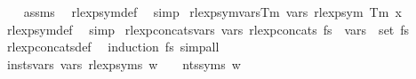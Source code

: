 \begin{isabellebody}
%
\isadelimproof
\ \ %
\endisadelimproof
%
\isatagproof
{}\isamarkupfalse%
\ assms\ \isamarkupfalse%
\ rlexp{\isacharunderscore}{\kern0pt}sym{\isacharunderscore}{\kern0pt}def\ \isamarkupfalse%
\ simp%
\endisatagproof
{\isafoldproof}%
%
\isadelimproof
\isanewline
%
\endisadelimproof
\isanewline
{}\isamarkupfalse%
\ rlexp{\isacharunderscore}{\kern0pt}sym{\isacharunderscore}{\kern0pt}vars{\isacharunderscore}{\kern0pt}Tm{\isacharcolon}{\kern0pt}\ {\isachardoublequoteopen}vars\ {\isacharparenleft}{\kern0pt}rlexp{\isacharunderscore}{\kern0pt}sym\ {\isacharparenleft}{\kern0pt}Tm\ x{\isacharparenright}{\kern0pt}{\isacharparenright}{\kern0pt}\ {\isacharequal}{\kern0pt}\ {\isacharbraceleft}{\kern0pt}{\isacharbraceright}{\kern0pt}{\isachardoublequoteclose}\isanewline
%
\isadelimproof
\ \ %
\endisadelimproof
%
\isatagproof
{}\isamarkupfalse%
\ rlexp{\isacharunderscore}{\kern0pt}sym{\isacharunderscore}{\kern0pt}def\ \isamarkupfalse%
\ simp%
\endisatagproof
{\isafoldproof}%
%
\isadelimproof
\isanewline
%
\endisadelimproof
\isanewline
{}\isamarkupfalse%
\ rlexp{\isacharunderscore}{\kern0pt}concats{\isacharunderscore}{\kern0pt}vars{\isacharcolon}{\kern0pt}\ {\isachardoublequoteopen}vars\ {\isacharparenleft}{\kern0pt}rlexp{\isacharunderscore}{\kern0pt}concats\ fs{\isacharparenright}{\kern0pt}\ {\isacharequal}{\kern0pt}\ {\isasymUnion}{\isacharparenleft}{\kern0pt}vars\ {\isacharbackquote}{\kern0pt}\ set\ fs{\isacharparenright}{\kern0pt}{\isachardoublequoteclose}\isanewline
%
\isadelimproof
\ \ %
\endisadelimproof
%
\isatagproof
{}\isamarkupfalse%
\ rlexp{\isacharunderscore}{\kern0pt}concats{\isacharunderscore}{\kern0pt}def\ \isamarkupfalse%
\ {\isacharparenleft}{\kern0pt}induction\ fs{\isacharparenright}{\kern0pt}\ simp{\isacharunderscore}{\kern0pt}all%
\endisatagproof
{\isafoldproof}%
%
\isadelimproof
\isanewline
%
\endisadelimproof
\isanewline
\isanewline
{}\isamarkupfalse%
\ insts{\isacharprime}{\kern0pt}{\isacharunderscore}{\kern0pt}vars{\isacharcolon}{\kern0pt}\ {\isachardoublequoteopen}vars\ {\isacharparenleft}{\kern0pt}rlexp{\isacharunderscore}{\kern0pt}syms\ w{\isacharparenright}{\kern0pt}\ {\isasymsubseteq}\ {\isasymgamma}{\isacharprime}{\kern0pt}\ {\isacharbackquote}{\kern0pt}\ nts{\isacharunderscore}{\kern0pt}syms\ w{\isachardoublequoteclose}\isanewline
%
\isadelimproof
%
\endisadelimproof
%
\isatagproof
{}\isamarkupfalse%
\isanewline
\ \ \isamarkupfalse%

\end{isabellebody}
